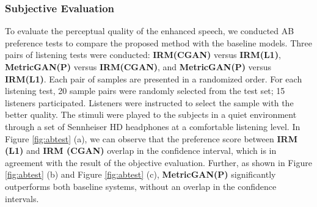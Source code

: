\documentclass{article}
\begin{document}
\subsubsection{Subjective Evaluation}
To evaluate the perceptual quality of the enhanced speech, we conducted AB preference tests to compare the proposed method with the baseline models. Three pairs of listening tests were conducted: \textbf{IRM(CGAN)} versus \textbf{IRM(L1)}, \textbf{MetricGAN(P)} versus \textbf{IRM(CGAN)}, and \textbf{MetricGAN(P)} versus \textbf{IRM(L1)}. Each pair of samples are presented in a randomized order. For each listening test, 20 sample pairs were randomly selected from the test set; 15 listeners participated. Listeners were instructed to select the sample with the better quality. The stimuli were played to the subjects in a quiet environment through a set of Sennheiser HD headphones at a comfortable listening level. In Figure \ref{fig:abtest} (a), we can observe that the preference score between \textbf{IRM (L1)} and \textbf{IRM (CGAN)} overlap in the confidence interval, which is in agreement with the result of the objective evaluation. Further, as shown in Figure \ref{fig:abtest} (b) and Figure \ref{fig:abtest} (c), \textbf{MetricGAN(P)} significantly outperforms both baseline systems, without an overlap in the confidence intervals.
\end{document}
